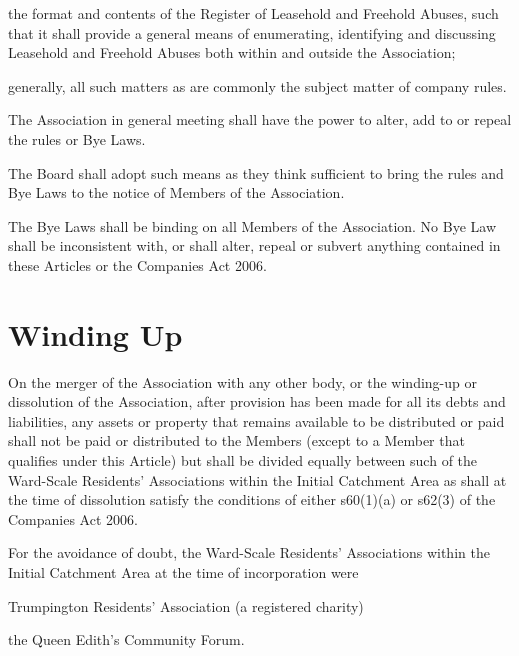 \documentclass[10pt]{mk-articles-of-association}
\newcommand{\EC}[0]{Board}
\newcommand{\Exec}[0]{\EC{} }
\newcommand{\WSRA}[0]{Ward-Scale Residents' Association}
\newcommand{\LAFA}[0]{Leasehold and Freehold Abuses}
\begin{document}
\begin{constenum}
\begin{constenum}
\item the format and contents of the Register of \LAFA, such that
  it shall provide a general means of enumerating, identifying and
  discussing \LAFA{} both within and outside the Association; \ITand

\item generally, all such matters as are commonly the subject matter
  of company rules.

\end{constenum}

\item The Association in general meeting shall have the power to
  alter, add to or repeal the rules or Bye Laws.

\item The \Exec shall adopt such means as they think sufficient to
  bring the rules and Bye Laws to the notice of Members of the Association.

\item The Bye Laws shall be binding on all Members of the
  Association. No Bye Law shall be inconsistent with, or shall
  alter, repeal or subvert anything contained in these Articles or
  the Companies Act 2006.
\end{constenum}


\section{Winding Up}

\begin{constenum}

\item On the merger of the Association with any other body, or the
  winding-up or dissolution of the Association, after provision has
  been made for all its debts and liabilities, any assets or property
  that remains available to be distributed or paid shall not be paid
  or distributed to the Members (except to a Member that qualifies
  under this Article) but shall be divided equally between such of the
  \WSRA{}s within the Initial Catchment Area as shall at the time of
  dissolution satisfy the conditions of either s60(1)(a) or s62(3)
  of the Companies Act 2006.

\item For the avoidance of doubt, the \WSRA{}s within the Initial
  Catchment Area at the time of incorporation were
  \begin{constenum}
    \item Trumpington Residents' Association (a registered charity) \ITand
    \item the Queen Edith's Community Forum.
  \end{constenum}

\end{constenum}
\end{document}
